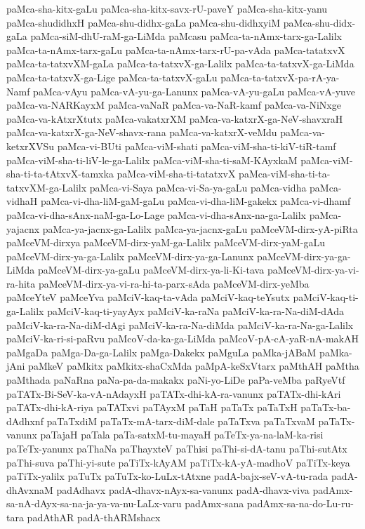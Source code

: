 {paMca-sha-kitx-gaLu
paMca-sha-kitx-savx-rU-paveY
paMca-sha-kitx-yanu
paMca-shudidhxH
paMca-shu-didhx-gaLa
paMca-shu-didhxyiM
paMca-shu-didx-gaLa
paMca-siM-dhU-raM-ga-LiMda
paMcasu
paMca-ta-nAmx-tarx-ga-Lalilx
paMca-ta-nAmx-tarx-gaLu
paMca-ta-nAmx-tarx-rU-pa-vAda
paMca-tatatxvX
paMca-ta-tatxvXM-gaLa
paMca-ta-tatxvX-ga-Lalilx
paMca-ta-tatxvX-ga-LiMda
paMca-ta-tatxvX-ga-Lige
paMca-ta-tatxvX-gaLu
paMca-ta-tatxvX-pa-rA-ya-Namf
paMca-vAyu
paMca-vA-yu-ga-Lanunx
paMca-vA-yu-gaLu
paMca-vA-yuve
paMca-va-NARKayxM
paMca-vaNaR
paMca-va-NaR-kamf
paMca-va-NiNxge
paMca-va-kAtxrXtutx
paMca-vakatxrXM
paMca-va-katxrX-ga-NeV-shavxraH
paMca-va-katxrX-ga-NeV-shavx-rana
paMca-va-katxrX-veMdu
paMca-va-ketxrXVSu
paMca-vi-BUti
paMca-viM-shati
paMca-viM-sha-ti-kiV-tiR-tamf
paMca-viM-sha-ti-liV-le-ga-Lalilx
paMca-viM-sha-ti-saM-KAyxkaM
paMca-viM-sha-ti-ta-tAtxvX-tamxka
paMca-viM-sha-ti-tatatxvX
paMca-viM-sha-ti-ta-tatxvXM-ga-Lalilx
paMca-vi-Saya
paMca-vi-Sa-ya-gaLu
paMca-vidha
paMca-vidhaH
paMca-vi-dha-liM-gaM-gaLu
paMca-vi-dha-liM-gakekx
paMca-vi-dhamf
paMca-vi-dha-sAnx-naM-ga-Lo-Lage
paMca-vi-dha-sAnx-na-ga-Lalilx
paMca-yajacnx
paMca-ya-jacnx-ga-Lalilx
paMca-ya-jacnx-gaLu
paMceVM-dirx-yA-piRta
paMceVM-dirxya
paMceVM-dirx-yaM-ga-Lalilx
paMceVM-dirx-yaM-gaLu
paMceVM-dirx-ya-ga-Lalilx
paMceVM-dirx-ya-ga-Lanunx
paMceVM-dirx-ya-ga-LiMda
paMceVM-dirx-ya-gaLu
paMceVM-dirx-ya-li-Ki-tava
paMceVM-dirx-ya-vi-ra-hita
paMceVM-dirx-ya-vi-ra-hi-ta-parx-sAda
paMceVM-dirx-yeMba
paMceYteV
paMceYva
paMciV-kaq-ta-vAda
paMciV-kaq-teYsutx
paMciV-kaq-ti-ga-Lalilx
paMciV-kaq-ti-yayAyx
paMciV-ka-raNa
paMciV-ka-ra-Na-diM-dAda
paMciV-ka-ra-Na-diM-dAgi
paMciV-ka-ra-Na-diMda
paMciV-ka-ra-Na-ga-Lalilx
paMciV-ka-ri-si-paRvu
paMcoV-da-ka-ga-LiMda
paMcoV-pA-cA-yaR-nA-makAH
paMgaDa
paMga-Da-ga-Lalilx
paMga-Dakekx
paMguLa
paMka-jABaM
paMka-jAni
paMkeV
paMkitx
paMkitx-shaCxMda
paMpA-keSxVtarx
paMthAH
paMtha
paMthada
paNaRna
paNa-pa-da-makakx
paNi-yo-LiDe
paPa-veMba
paRyeVtf
paTATx-Bi-SeV-ka-vA-nAdayxH
paTATx-dhi-kA-ra-vanunx
paTATx-dhi-kAri
paTATx-dhi-kA-riya
paTATxvi
paTAyxM
paTaH
paTaTx
paTaTxH
paTaTx-ba-dAdhxnf
paTaTxdiM
paTaTx-mA-tarx-diM-dale
paTaTxva
paTaTxvaM
paTaTx-vanunx
paTajaH
paTala
paTa-satxM-tu-mayaH
paTeTx-ya-na-laM-ka-risi
paTeTx-yanunx
paThaNa
paThayxteV
paThisi
paThi-si-dA-tanu
paThi-sutAtx
paThi-suva
paThi-yi-sute
paTiTx-kAyAM
paTiTx-kA-yA-madhoV
paTiTx-keya
paTiTx-yalilx
paTuTx
paTuTx-ko-LuLx-tAtxne
padA-bajx-seV-vA-tu-rada
padA-dhAvxnaM
padAdhavx
padA-dhavx-nAyx-sa-vanunx
padA-dhavx-viva
padAmx-sa-nA-dAyx-sa-na-ja-ya-va-nu-LaLx-varu
padAmx-sana
padAmx-sa-na-do-Lu-ru-tara
padAthAR
padA-thARMshacx
}
